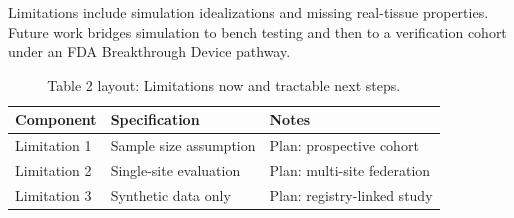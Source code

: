 
Limitations include simulation idealizations and missing real-tissue properties. Future work bridges simulation to bench testing and then to a verification cohort under an FDA Breakthrough Device pathway.

\begin{table}[H]
\caption{Table 2 layout: Limitations now and tractable next steps.}
\label{tab:limits_future}
\centering
\begin{tabular}{>{\raggedright\arraybackslash}p{3.4cm} >{\raggedright\arraybackslash}p{4.6cm} >{\raggedright\arraybackslash}p{5.4cm}}
\toprule
\textbf{Component} & \textbf{Specification} & \textbf{Notes} \\
\midrule
  Limitation 1 & Sample size assumption & Plan: prospective cohort \\
  Limitation 2 & Single-site evaluation & Plan: multi-site federation \\
  Limitation 3 & Synthetic data only & Plan: registry-linked study \\
\bottomrule
\end{tabular}
\end{table}
